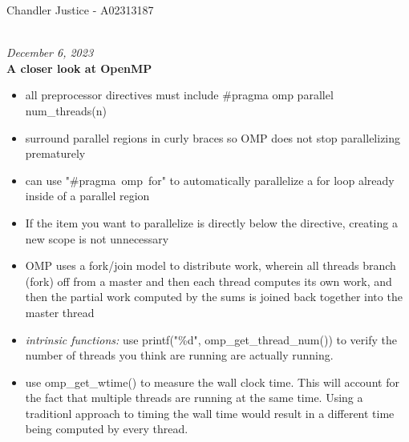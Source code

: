 \documentclass[10pt, AMS Euler]{article}
\begin{document}
\begin{flushright}
Chandler Justice - A02313187
\end{flushright}
\noindent \underline{\hspace{3in}}\\

\textit{December 6, 2023}\\

\textbf{A closer look at OpenMP}\\

\begin{itemize}
    \item all preprocessor directives must include \#pragma omp parallel num\_threads(n)
    \item surround parallel regions in curly braces so OMP does not stop parallelizing prematurely
    \item can use "\#pragma\ omp\ for" to automatically parallelize a for loop already inside of a parallel region
    \item If the item you want to parallelize is directly below the directive, creating a new scope is not unnecessary
    \item OMP uses a fork/join model to distribute work, wherein all threads branch (fork) off from a master and then each thread computes its own work, and then the partial work computed by the sums is joined back together into the master thread
    \item \textit{intrinsic functions:} use printf("\%d", omp\_get\_thread\_num()) to verify the number of threads you think are running are actually running.
    \item use omp\_get\_wtime() to measure the wall clock time. This will account for the fact that multiple threads are running at the same time. Using a traditionl approach to timing the wall time would result in a different time being computed by every thread.
\end{itemize}

\noindent \underline{\hspace{3in}}\\
\end{document}
